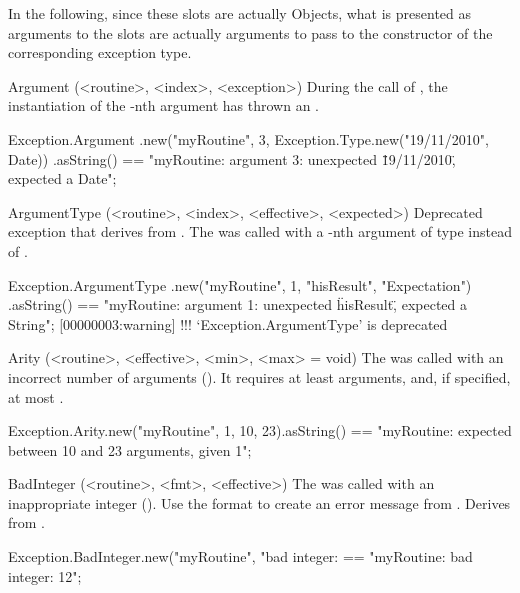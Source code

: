 In the following, since these slots are actually Objects, what is presented
as arguments to the slots are actually arguments to pass to the constructor
of the corresponding exception type.
\begin{urbiscriptapi}
\item[Argument](<routine>, <index>, <exception>)
  During the call of , the instantiation of the -nth
  argument has thrown an .
\begin{urbiassert}
Exception.Argument
  .new("myRoutine", 3, Exception.Type.new("19/11/2010", Date))
  .asString()
== "myRoutine: argument 3: unexpected \"19/11/2010\", expected a Date";
\end{urbiassert}


\item[ArgumentType](<routine>, <index>, <effective>, <expected>)%
  Deprecated exception that derives from .  The 
  was called with a -nth argument of type  instead
  of .
\begin{urbiassert}
Exception.ArgumentType
  .new("myRoutine", 1, "hisResult", "Expectation")
  .asString()
== "myRoutine: argument 1: unexpected \"hisResult\", expected a String";
[00000003:warning] !!! `Exception.ArgumentType' is deprecated
\end{urbiassert}


\item[Arity](<routine>, <effective>, <min>, <max> = void)%
  The  was called with an incorrect number of arguments
  ().  It requires at least  arguments, and,
  if specified, at most .
\begin{urbiassert}
Exception.Arity.new("myRoutine", 1, 10, 23).asString()
  == "myRoutine: expected between 10 and 23 arguments, given 1";
\end{urbiassert}


\item[BadInteger](<routine>, <fmt>, <effective>)%
  The  was called with an inappropriate integer
  ().  Use the format  to create an error
  message from .  Derives from
  .
\begin{urbiassert}
Exception.BadInteger.new("myRoutine", "bad integer: %
  == "myRoutine: bad integer: 12";
\end{urbiassert}



\end{urbiscriptapi}
